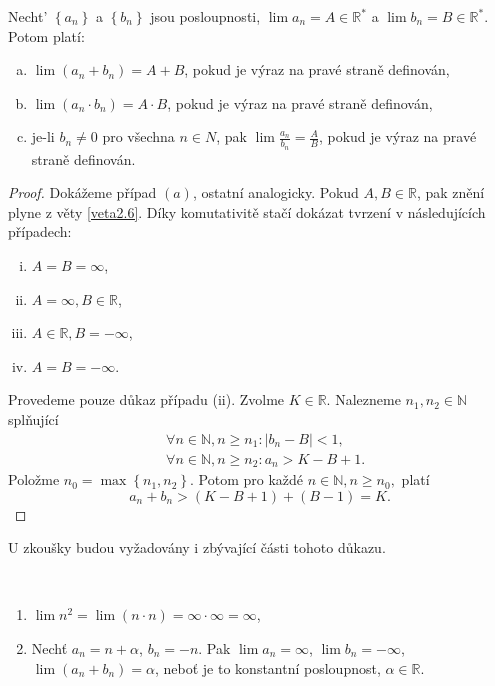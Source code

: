 \begin{veta}
    Necht’ $\left \{ a_n \right \} $ a $\left \{ b_n \right \} $ jsou posloupnosti, $ \lim a_n = A \in \mathbb R ^*$ a
    $\lim b_n = B \in \mathbb R ^*$. Potom platí:
    \begin{enumerate}[(a)]
    	\item $\lim (a_n + b_n) = A + B$, pokud je výraz na pravé straně definován,
    	\item $\lim (a_n\cdot b_n) = A\cdot B$, pokud je výraz na pravé straně definován,
    	\item je-li $b_n \ne 0$ pro všechna $n \in N$, pak $\lim \frac{a_n}{b_n} = \frac{A}{B}$, pokud
    	je výraz na pravé straně definován.
    \end{enumerate}
\end{veta}

\begin{proof}
	Dokážeme případ $(a)$, ostatní analogicky. Pokud $A,B\in \mathbb R $, pak znění plyne z věty \ref{veta2.6}.
	Díky komutativitě stačí dokázat tvrzení v následujících případech:
	\begin{enumerate}[(i)]
		\item $A=B=\infty$,
		\item $A=\infty, B\in \mathbb R$,
		\item $A\in \mathbb R, B=-\infty$,
		\item $A = B = -\infty$.
	\end{enumerate}
	Provedeme pouze důkaz případu (ii). Zvolme $K\in \mathbb R $. Nalezneme $n_1,n_2\in \mathbb N $ splňující
	\begin{align*}
	    &\forall n \in \mathbb N, n \geq n_1: |b_n - B| < 1,\\
		&\forall n\in \mathbb N , n \geq n_2: a_n > K - B + 1.
	\end{align*}
	Položme $n_0 = \max \left \{ n_1,n_2 \right \} $. Potom pro každé $n\in \mathbb N ,n\geq n_0,$ platí
	$$
	    a_n + b_n > (K-B+1) + (B-1) = K.
	$$
\end{proof}

\begin{poznamka}
	U zkoušky budou vyžadovány i zbývající části tohoto důkazu.
\end{poznamka}

\begin{priklad}\,
\begin{enumerate}[(1)]
	\item $\lim n^2 = \lim(n\cdot n)=\infty \cdot \infty = \infty$,
	\item Nechť $a_n=n+\alpha$, $b_n = -n$. Pak $\lim a_n = \infty$, $\lim b_n = -\infty$, $\lim(a_n+ b_n)=\alpha$,
	neboť je to konstantní posloupnost, $\alpha \in \mathbb R $.
\end{enumerate}
\end{priklad}

